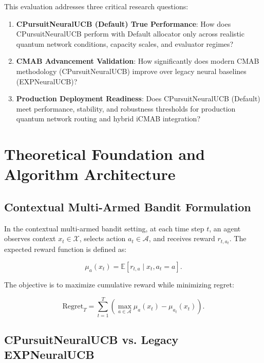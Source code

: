 \documentclass[12pt,a4paper]{article}
\begin{document}
This evaluation addresses three critical research questions:

\begin{enumerate}
    \item \textbf{CPursuitNeuralUCB (Default) True Performance}: How does CPursuitNeuralUCB perform with Default allocator only across realistic quantum network conditions, capacity scales, and evaluator regimes?
    
    \item \textbf{CMAB Advancement Validation}: How significantly does modern CMAB methodology (CPursuitNeuralUCB) improve over legacy neural baselines (EXPNeuralUCB)?
    
    \item \textbf{Production Deployment Readiness}: Does CPursuitNeuralUCB (Default) meet performance, stability, and robustness thresholds for production quantum network routing and hybrid iCMAB integration?
\end{enumerate}

\section{Theoretical Foundation and Algorithm Architecture}

\subsection{Contextual Multi-Armed Bandit Formulation}

In the contextual multi-armed bandit setting, at each time step $t$, an agent observes context $x_t \in \mathcal{X}$, selects action $a_t \in \mathcal{A}$, and receives reward $r_{t,a_t}$. The expected reward function is defined as:

\begin{equation}
\mu_a(x_t) = \mathbb{E}[r_{t,a} \mid x_t, a_t = a].
\end{equation}

The objective is to maximize cumulative reward while minimizing regret:

\begin{equation}
\text{Regret}_T = \sum_{t=1}^{T} \left(\max_{a \in \mathcal{A}} \mu_a(x_t) - \mu_{a_t}(x_t)\right).
\end{equation}

\subsection{CPursuitNeuralUCB vs. Legacy EXPNeuralUCB}
\end{document}
